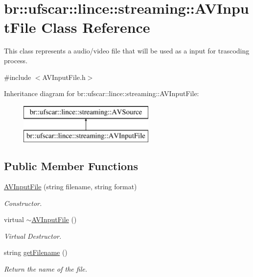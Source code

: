 \hypertarget{classbr_1_1ufscar_1_1lince_1_1streaming_1_1AVInputFile}{
\section{br::ufscar::lince::streaming::AVInputFile Class Reference}
\label{classbr_1_1ufscar_1_1lince_1_1streaming_1_1AVInputFile}
}


This class represents a audio/video file that will be used as a input for trascoding process.  




{\ttfamily \#include $<$AVInputFile.h$>$}

Inheritance diagram for br::ufscar::lince::streaming::AVInputFile:\begin{figure}[H]
\begin{center}
\leavevmode
\includegraphics[height=2cm]{classbr_1_1ufscar_1_1lince_1_1streaming_1_1AVInputFile}
\end{center}
\end{figure}
\subsection*{Public Member Functions}
\begin{DoxyCompactItemize}
\item 
\hyperlink{classbr_1_1ufscar_1_1lince_1_1streaming_1_1AVInputFile_a30af8ac740b089f743e0233e31549699}{AVInputFile} (string filename, string format)
\begin{DoxyCompactList}\small\item\em Constructor. \item\end{DoxyCompactList}\item 
virtual \hyperlink{classbr_1_1ufscar_1_1lince_1_1streaming_1_1AVInputFile_a9b28035106da1e3856b5d8c9cba1136a}{$\sim$AVInputFile} ()
\begin{DoxyCompactList}\small\item\em Virtual Destructor. \item\end{DoxyCompactList}\item 
string \hyperlink{classbr_1_1ufscar_1_1lince_1_1streaming_1_1AVInputFile_a5395f69e91d985691522ae97c6374e37}{getFilename} ()
\begin{DoxyCompactList}\small\item\em Return the name of the file. \item\end{DoxyCompactList}\end{DoxyCompactItemize}
